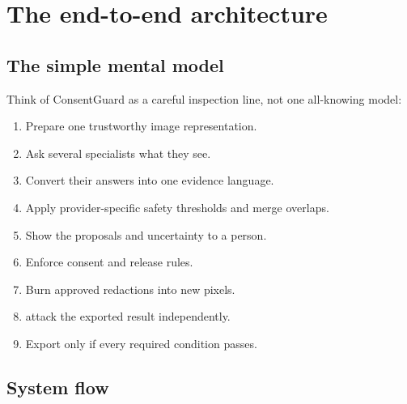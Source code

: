 \chapter{The end-to-end architecture}

\section{The simple mental model}

Think of ConsentGuard as a careful inspection line, not one all-knowing model:

\begin{enumerate}[leftmargin=7mm]
  \item Prepare one trustworthy image representation.
  \item Ask several specialists what they see.
  \item Convert their answers into one evidence language.
  \item Apply provider-specific safety thresholds and merge overlaps.
  \item Show the proposals and uncertainty to a person.
  \item Enforce consent and release rules.
  \item Burn approved redactions into new pixels.
  \item attack the exported result independently.
  \item Export only if every required condition passes.
\end{enumerate}

\section{System flow}

